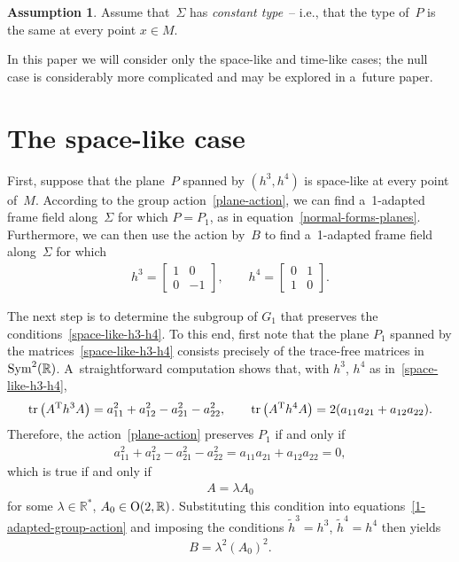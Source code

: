 \documentclass[10pt,a4paper]{amsart}
\numberwithin{equation}{section}
\theoremstyle{definition}
\newtheorem{assumption}[teo]{Assumption}
\DeclareMathOperator{\tr}{tr}
\begin{document}
\begin{assumption}
\label{constant-type-assumption}
Assume that~$\Sigma$ has {\em constant type}~-- i.e., that the type of~$P$ is the same at every point $x \in M$.
\end{assumption}

In this paper we will consider only the space-like and time-like cases; the null case is considerably more complicated and
may be explored in a~future paper.


\section{The space-like case}\label{space-like-sec}

First, suppose that the plane~$P$ spanned by $(h^3, h^4)$ is space-like at every point of~$M$.
According to the group action~\eqref{plane-action}, we can f\/ind a~1-adapted frame f\/ield along~$\Sigma$ for which
$P=P_1$, as in equation~\eqref{normal-forms-planes}.
Furthermore, we can then use the action by~$B$ to f\/ind a~1-adapted frame f\/ield along~$\Sigma$ for which
\begin{gather}
\label{space-like-h3-h4}
h^3 =
\begin{bmatrix}
1 & 0
\\
0 & -1
\end{bmatrix},
\qquad
h^4 =
\begin{bmatrix}
0 & 1
\\
1 & 0
\end{bmatrix}.
\end{gather}

The next step is to determine the subgroup of $G_1$ that preserves the conditions~\eqref{space-like-h3-h4}.
To this end, f\/irst note that the plane $P_1$ spanned by the matrices~\eqref{space-like-h3-h4} consists precisely of the
trace-free matrices in ${\rm Sym}^2(\mathbb{R})$.
A~straightforward computation shows that, with $h^3$, $h^4$ as in~\eqref{space-like-h3-h4},
\begin{gather*}
\tr\big(A^{\rm T} h^3 A\big) = a_{11}^2 + a_{12}^2 - a_{21}^2 - a_{22}^2,
\qquad
\tr\big(A^{\rm T} h^4 A\big) = 2(a_{11} a_{21} + a_{12} a_{22}).
\end{gather*}
Therefore, the action~\eqref{plane-action} preserves $P_1$ if and only if
\begin{gather*}
a_{11}^2 + a_{12}^2 - a_{21}^2 - a_{22}^2 = a_{11} a_{21} + a_{12} a_{22} = 0,
\end{gather*}
which is true if and only if
\begin{gather*}
A = \lambda A_0
\end{gather*}
for some $\lambda \in \mathbb{R}^*$, $A_0 \in {\rm O}(2, \mathbb{R})$.
Substituting this condition into equations~\eqref{1-adapted-group-action} and imposing the conditions $\tilde{h}^3 =
h^3$, $\tilde{h}^4 = h^4$ then yields
\begin{gather*}
B = \lambda^2 (A_0)^2.
\end{gather*}
\end{document}
